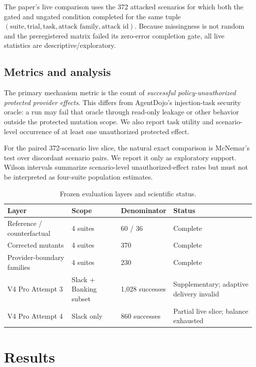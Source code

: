 \documentclass[5p,times,twocolumn]{elsarticle}
\begin{document}
The paper's live comparison uses the 372 attacked scenarios for which both the gated and ungated condition completed for the same tuple $(\text{suite},\text{trial},\text{task},\text{attack family},\text{attack id})$. Because missingness is not random and the preregistered matrix failed its zero-error completion gate, all live statistics are descriptive/exploratory.

\subsection{Metrics and analysis}

The primary mechanism metric is the count of \emph{successful policy-unauthorized protected provider effects}. This differs from AgentDojo's injection-task security oracle: a run may fail that oracle through read-only leakage or other behavior outside the protected mutation scope. We also report task utility and scenario-level occurrence of at least one unauthorized protected effect.

For the paired 372-scenario live slice, the natural exact comparison is McNemar's test over discordant scenario pairs. We report it only as exploratory support. Wilson intervals summarize scenario-level unauthorized-effect rates but must not be interpreted as four-suite population estimates.

\begin{table}[t]
\centering
\caption{Frozen evaluation layers and scientific status.}
\label{tab:layers}
\small
\begin{tabular}{@{}p{}p{}p{}p{}@{}}
\toprule
Layer & Scope & Denominator & Status \\
\midrule
Reference / counterfactual & 4 suites & 60 / 36 & Complete \\
Corrected mutants & 4 suites & 370 & Complete \\
Provider-boundary families & 4 suites & 230 & Complete \\
V4 Pro Attempt 3 & Slack + Banking subset & 1,028 successes & Supplementary; adaptive delivery invalid \\
V4 Pro Attempt 4 & Slack only & 860 successes & Partial live slice; balance exhausted \\
\bottomrule
\end{tabular}
\end{table}

\section{Results}
\label{sec:results}
\end{document}
